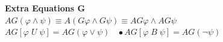 \documentclass{article}
\begin{document}
\begin{multicols}{4}
\textbf{Extra Equations G}\\
$AG(\varphi \wedge \psi) \equiv A(G\varphi \wedge G\psi) \equiv AG\varphi \wedge AG\psi $ \\
$ AG[\varphi \; U \; \psi] = AG(\varphi \vee \psi)\ \ \ \ \bullet AG[\varphi \; B \; \psi] = AG(\neg \psi)$\\

\end{multicols}
\end{document}
